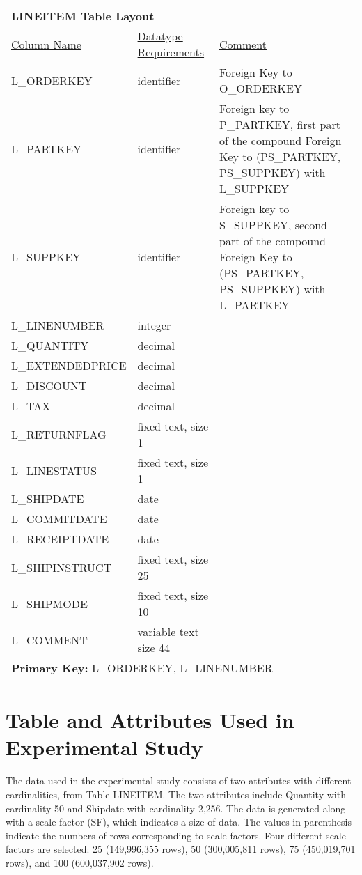 \documentclass[../main/thesis.tex]{subfiles}
\begin{document}
\begin{longtable}{p{3.9cm}p{3.9cm}p{5.8cm}}
	\multicolumn{3}{l}{\bf LINEITEM Table Layout} \\
	\underline{Column Name} 	& \underline{Datatype Requirements} & \underline{Comment} \\
	L\_ORDERKEY		&	identifier	&	Foreign Key to O\_ORDERKEY \\
	L\_PARTKEY		&	identifier	&	Foreign key to P\_PARTKEY, first part of the compound Foreign Key to (PS\_PARTKEY, PS\_SUPPKEY) with L\_SUPPKEY \\
	L\_SUPPKEY		&	identifier	&	Foreign key to S\_SUPPKEY, second part of the compound Foreign Key to (PS\_PARTKEY, PS\_SUPPKEY) with L\_PARTKEY \\
	L\_LINENUMBER	&	integer		& \\
	L\_QUANTITY		&	decimal		& \\	
	L\_EXTENDEDPRICE	&	decimal		& \\	
	L\_DISCOUNT		&	decimal		& \\	
	L\_TAX			&	decimal		& \\	
	L\_RETURNFLAG	&	fixed text, size 1		& \\	
	L\_LINESTATUS	&	fixed text, size 1		& \\
	L\_SHIPDATE		&	date		& \\
	L\_COMMITDATE	&	date		& \\
	L\_RECEIPTDATE	&	date		& \\
	L\_SHIPINSTRUCT	&	fixed text, size 25		& \\
	L\_SHIPMODE		&	fixed text, size 10		& \\
	L\_COMMENT		&	variable text size 44		& \\
	\multicolumn{3}{l}{\textbf{Primary Key:} L\_ORDERKEY, L\_LINENUMBER}
\end{longtable}

\section{Table and Attributes Used in Experimental Study}
The data used in the experimental study consists of two attributes with different cardinalities, from Table LINEITEM. The two attributes include Quantity with cardinality 50 and Shipdate with cardinality 2,256. The data is generated along with a scale factor (SF), which indicates a size of data. The values in parenthesis indicate the numbers of rows corresponding to scale factors. Four different scale factors are selected: 25 (149,996,355 rows), 50 (300,005,811 rows), 75 (450,019,701 rows), and 100 (600,037,902 rows).
\end{document}

